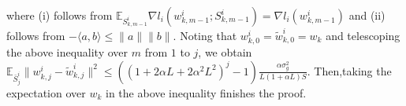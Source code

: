 \documentclass{osudissert96}
\begin{document}
\hspace{-0.2cm}	where (i) follows from $\mathbb{E}_{S_{k,m-1}^i}  \nabla l_i(w_{k,m-1}^i; S_{k,m-1}^i)= \nabla l_i(w_{k,m-1}^i)$ and (ii) follows from $-\langle a,b\rangle\leq \|a\|\|b\|$. 
 	Noting that $w_{k,0}^i= \widetilde w_{k,0}^i = w_k$ and telescoping the above inequality over $m$ from $1$ to $j$, we obtain
	$\mathbb{E}_{\bar S^i_j}\|w_{k,j}^i - \widetilde w_{k,j}^i\|^2 \leq \left( (1+2\alpha L + 2\alpha^2L^2) ^j -1 \right)\frac{\alpha \sigma_g^2}{L(1+\alpha L) S}$.
	Then,taking the expectation over $w_k$ in the above inequality finishes the proof. 

\end{document}
